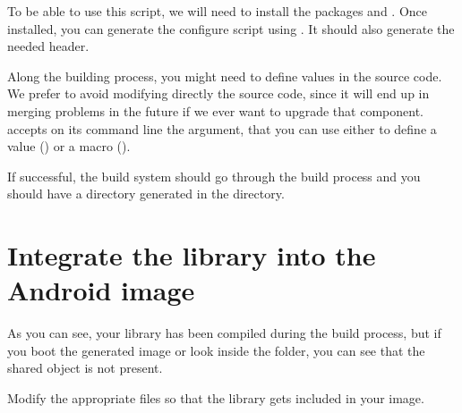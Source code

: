 To be able to use this script, we will need to install the packages
 and . Once installed, you can generate
the configure script using . It should also
generate the needed  header.

Along the building process, you might need to define values in the
source code. We prefer to avoid modifying directly the source code,
since it will end up in merging problems in the future if we ever want
to upgrade that component.  accepts on its command line the
 argument, that you can use either to define a value
() or a macro ().

If successful, the build system should go through the build process
and you should have a directory generated in the  directory.

\section{Integrate the library into the Android image}

As you can see, your library has been compiled during the build
process, but if you boot the generated image or look inside the
folder, you can see that the shared object is not present.

Modify the appropriate files so that the library gets included in your
image.
